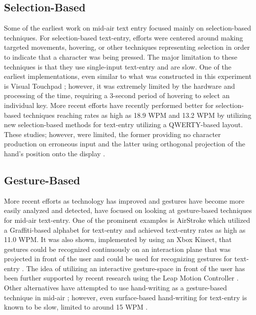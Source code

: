 \subsection{Selection-Based}
Some of the earliest work on mid-air text entry focused mainly on selection-based techniques. For selection-based text-entry, efforts were centered around making targeted movements, hovering, or other techniques representing selection in order to indicate that a character was being pressed. The major limitation to these techniques is that they use single-input text-entry and are slow. One of the earliest implementations, even similar to what was constructed in this experiment is Visual Touchpad \cite{ref_visual_touchpad}; however, it was extremely limited by the hardware and processing of the time, requiring a 3-second period of hovering to select an individual key. More recent efforts have recently performed better for selection-based techniques reaching rates as high as 18.9 WPM \cite{ref_mid_air_text_large_displays} and 13.2 WPM \cite{ref_selection_based_mid_air} by utilizing new selection-based methods for text-entry utilizing a QWERTY-based layout. These studies; however, were limited, the former providing no character production on erroneous input \cite{ref_mid_air_text_large_displays} and the latter using orthogonal projection of the hand's position onto the display \cite{ref_selection_based_mid_air}.

\subsection{Gesture-Based}
More recent efforts as technology has improved and gestures have become more easily analyzed and detected, have focused on looking at gesture-based techniques for mid-air text-entry. One of the prominent examples is AirStroke \cite{ref_airstroke} which utilized a Graffiti-based alphabet for text-entry and achieved text-entry rates as high as 11.0 WPM. It was also shown, implemented by using an Xbox Kinect, that gestures could be recognized continuously on an interaction plane that was projected in front of the user \cite{ref_continuous_recognition} and could be used for recognizing gestures for text-entry \cite{ref_graffiti_vs_unistroke}. The idea of utilizing an interactive gesture-space in front of the user has been further supported by recent research using the Leap Motion Controller \cite{ref_alvin_thesis,ref_darren_thesis}. Other alternatives have attempted to use hand-writing as a gesture-based technique in mid-air \cite{ref_air_handwriting,ref_air_writing_continuous_recognition,ref_mid_air_text_entry_handwriting,ref_detecting_handwritten_characters}; however, even surface-based hand-writing for text-entry is known to be slow, limited to around 15 WPM \cite{ref_handprinting_alternatives}.

